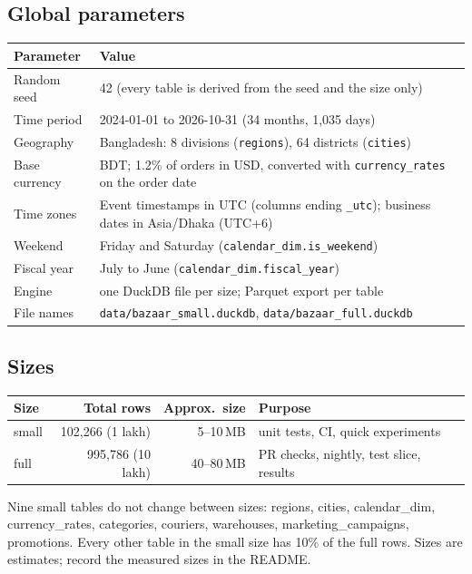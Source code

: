 \documentclass[11pt,a4paper]{article}
\newcommand{\code}[1]{\texttt{\small #1}}
\begin{document}
\subsection{Global parameters}

\begin{center}
\small
\begin{tabularx}{\linewidth}{@{}l X@{}}
\toprule
\textbf{Parameter} & \textbf{Value}\\
\midrule
Random seed & 42 (every table is derived from the seed and the size only)\\
Time period & 2024-01-01 to 2026-10-31 (34 months, 1{,}035 days)\\
Geography & Bangladesh: 8 divisions (\code{regions}), 64 districts (\code{cities})\\
Base currency & BDT; 1.2\% of orders in USD, converted with \code{currency\_rates} on the order date\\
Time zones & Event timestamps in UTC (columns ending \code{\_utc}); business dates in Asia/Dhaka (UTC+6)\\
Weekend & Friday and Saturday (\code{calendar\_dim.is\_weekend})\\
Fiscal year & July to June (\code{calendar\_dim.fiscal\_year})\\
Engine & one DuckDB file per size; Parquet export per table\\
File names & \code{data/bazaar\_small.duckdb}, \code{data/bazaar\_full.duckdb}\\
\bottomrule
\end{tabularx}
\end{center}

\subsection{Sizes}

\begin{center}
\begin{tabular}{@{}l r r l@{}}
\toprule
\textbf{Size} & \textbf{Total rows} & \textbf{Approx.\ size} & \textbf{Purpose}\\
\midrule
small & 102{,}266 (1 lakh) & 5--10\,MB & unit tests, CI, quick experiments\\
full & 995{,}786 (10 lakh) & 40--80\,MB & PR checks, nightly, test slice, results\\
\bottomrule
\end{tabular}

{\footnotesize\color{grey} Nine small tables do not change between sizes: regions, cities, calendar\_dim,
currency\_rates, categories, couriers, warehouses, marketing\_campaigns, promotions. Every other table
in the small size has 10\% of the full rows. Sizes are estimates; record the measured sizes in the README.}
\end{center}
\end{document}
